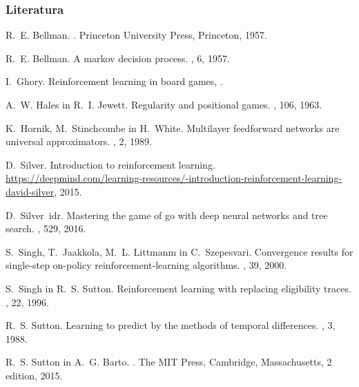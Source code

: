 \documentclass{beamer}    %
\begin{document}
\begin{frame}[t, allowframebreaks]
    \frametitle{Literatura}
    \nocite{*}
    \begin{thebibliography}{10}

        R.~E. Bellman.
        .
        \newblock Princeton University Press, Princeton, 1957.
        
        R.~E. Bellman.
        \newblock A markov decision process.
        , 6, 1957.
        
        I.~Ghory.
        \newblock Reinforcement learning in board games,
        .
        
        A.~W. Hales in R.~I. Jewett.
        \newblock Regularity and positional games.
        , 106, 1963.
        
        K.~Hornik, M.~Stinchcombe in H.~White.
        \newblock Multilayer feedforward networks are universal approximators.
        , 2, 1989.
        
        D.~Silver.
        \newblock Introduction to reinforcement learning.
        \newblock
          \url{https://deepmind.com/learning-resources/-introduction-reinforcement-learning-david-silver},
          2015.
        
        D.~Silver~idr.
        \newblock Mastering the game of go with deep neural networks and tree search.
        , 529, 2016.
        
        S.~Singh, T.~Jaakkola, M.~L. Littmanm in C.~Szepesvari.
        \newblock Convergence results for single-step on-policy reinforcement-learning
          algorithms.
        , 39, 2000.
        
        S.~Singh in R.~S. Sutton.
        \newblock Reinforcement learning with replacing eligibility traces.
        , 22, 1996.
        
        R.~S. Sutton.
        \newblock Learning to predict by the methods of temporal differences.
        , 3, 1988.
        
        R.~S. Sutton in A.~G. Barto.
        .
        \newblock The MIT Press, Cambridge, Massachusetts, 2 edition, 2015.
        

\end{thebibliography}
\end{frame}
\end{document}
